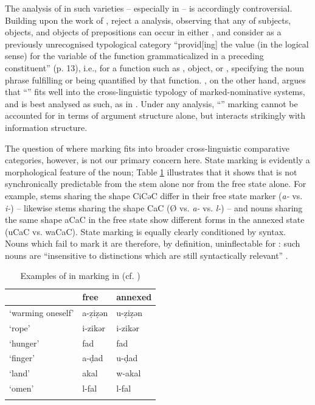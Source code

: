 \documentclass[output=paper,colorlinks,citecolor=brown]{langscibook}
\begin{document}
The analysis of  in such varieties -- especially in  -- is accordingly controversial. Building upon the work of \citet{galand1969}, \citet{mettouchifrajzyngier2013} reject a  analysis, observing that any of subjects, objects, and objects of prepositions can occur in either , and consider  as a previously unrecognised typological category ``provid[ing] the value (in the logical sense) for the variable of the function grammaticalized in a preceding constituent'' (p. 13), i.e., for a function such as , object, or , specifying the noun phrase fulfilling or being quantified by that function. \citet{arkadiev2015}, on the other hand, argues that  ``'' fits well into the cross-linguistic typology of marked-nominative  systems, and is best analysed as such, as in \citet{creissels2009-uncommon}. Under any analysis,  ``'' marking cannot be accounted for in terms of argument structure alone, but interacts strikingly with information structure.

The question of where  marking fits into broader cross-linguistic comparative categories, however, is not our primary concern here. State marking is evidently a morphological feature of the noun; Table \ref{13tab2} illustrates that it shows  that is not synchronically predictable from the stem alone nor from the free state alone. For example, stems sharing the shape CiCəC differ in their free state marker (\emph{a-} vs. \emph{i-}) -- likewise stems sharing the shape CaC (Ø vs. \emph{a-} vs. \emph{l-}) -- and nouns sharing the same shape aCaC in the free state show different forms in the annexed state (uCaC vs. waCaC). State marking is equally clearly conditioned by syntax. Nouns which fail to mark it are therefore, by definition, uninflectable for : such nouns are ``insensitive to distinctions which are still syntactically relevant'' \citep[30]{baermanbrowncorbett2005}.

\begin{table}[ht]
	\centering
	\begin{tabular}{lll}%
		\lsptoprule
							  & free\is{state!free} & annexed\is{state!annexed} \\
			\midrule
			`warming oneself' & a-ẓiẓən 			  & u-ẓiẓən \\
			`rope' 			  & i-zikər 			& i-zikər \\
			\tablevspace
			`hunger' 		  & fad 				& fad \\
			`finger' 		  & a-ḍad 				 & u-ḍad \\
			`land' 			  & akal 				& w-akal \\
			`omen' 			  & l-fal 				& l-fal \\
		\lspbottomrule
	\end{tabular}
	\caption{Examples of  in  marking in  (cf. \citealt{dallet1982})}
	\label{13tab2}
\end{table}
\end{document}
